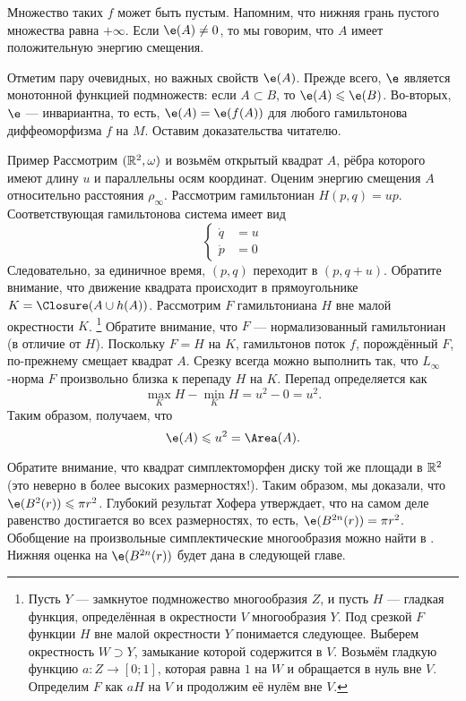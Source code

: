 Множество таких $f$ может быть пустым.
Напомним, что нижняя грань пустого множества равна $+\infty$.
Если $\e (A) \ne 0$, то мы говорим, что $A$ имеет положительную энергию смещения.

Отметим пару очевидных, но важных свойств $\e(A)$.
Прежде всего, $\e$ является монотонной функцией подмножеств: если $A \subset B$, то $\e(A) \le \e(B)$.
Во-вторых, $\e$ --- инвариантна, то есть, $\e (A) = \e (f (A))$ для любого гамильтонова диффеоморфизма $f$ на $M$.
Оставим доказательства читателю.

\begin{ex*}{Пример}
Рассмотрим $(\mathbb{R}^2, \omega)$ и возьмём открытый квадрат $A$, рёбра которого имеют длину $u$ и параллельны осям координат.
Оценим энергию смещения $A$ относительно расстояния $\rho_\infty$.
Рассмотрим гамильтониан $H (p, q) = up$.
Соответствующая гамильтонова система имеет вид 
\[
\begin{cases}
\dot q &= u
\\
\dot p &= 0
\end{cases}
\]
Следовательно, за единичное время, $(p, q)$ переходит в $(p, q + u)$.
Обратите внимание, что движение квадрата происходит в прямоугольнике $K = \Closure (A \cup h (A))$.
Рассмотрим  $F$ гамильтониана $H$ вне малой окрестности $K$.%
\footnote{Пусть $Y$ --- замкнутое подмножество многообразия $Z$, и пусть $H$ --- гладкая функция, определённая в окрестности $V$ многообразия $Y$.
Под срезкой $F$ функции $H$ вне малой окрестности $Y$ понимается следующее.
Выберем окрестность $W\supset Y$, замыкание которой содержится в $V$.
Возьмём гладкую функцию $a\colon Z \to [0; 1]$, которая равна $1$ на $W$ и обращается в нуль вне $V$.
Определим $F$ как $aH$ на $V$ и продолжим её нулём вне $V$.}
Обратите внимание, что $F$ --- нормализованный гамильтониан (в отличие от $H$).
Поскольку $F = H$ на $K$, гамильтонов поток $f$, порождённый $F$, по-прежнему смещает квадрат $A$.
Срезку всегда можно выполнить так, что $L_\infty$-норма $F$ произвольно близка к перепаду $H$ на $K$.
Перепад определяется как 
\[\max_K H - \min_K H = u^2 - 0 = u^2.\]
Таким образом, получаем, что 
\[\e (A) \le u^2 = \Area (A).\]
\end{ex*}

Обратите внимание, что квадрат симплектоморфен диску той же площади в $\mathbb{R}^2$ (это неверно в более высоких размерностях!).
Таким образом, мы доказали, что $\e (B^2 (r)) \le \pi r^2$.
Глубокий результат Хофера \cite{H1} утверждает, что на самом деле равенство
достигается во всех размерностях, то есть, $\e (B^{2n} (r)) = \pi r^2$.
Обобщение на произвольные симплектические многообразия можно найти в \cite{LM1}.
Нижняя оценка на $\e(B^{2n} (r))$ будет дана в следующей главе.

